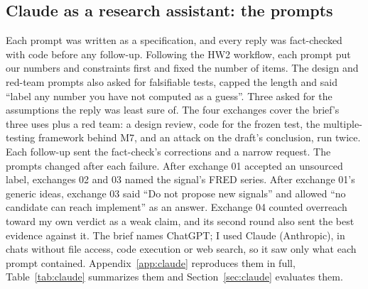 \subsection{Claude as a research assistant: the prompts}
\label{sec:prompts}

Each prompt was written as a specification, and every reply was fact-checked with code before any follow-up. Following the HW2 workflow, each prompt put our numbers and constraints first and fixed the number of items. The design and red-team prompts also asked for falsifiable tests, capped the length and said ``label any number you have not computed as a guess''. Three asked for the assumptions the reply was least sure of. The four exchanges cover the brief's three uses plus a red team: a design review, code for the frozen test, the multiple-testing framework behind M7, and an attack on the draft's conclusion, run twice. Each follow-up sent the fact-check's corrections and a narrow request. The prompts changed after each failure. After exchange 01 accepted an unsourced label, exchanges 02 and 03 named the signal's FRED series. After exchange 01's generic ideas, exchange 03 said ``Do not propose new signals'' and allowed ``no candidate can reach implement'' as an answer. Exchange 04 counted overreach toward my own verdict as a weak claim, and its second round also sent the best evidence against it. The brief names ChatGPT; I used Claude (Anthropic), in chats without file access, code execution or web search, so it saw only what each prompt contained. Appendix~\ref{app:claude} reproduces them in full, Table~\ref{tab:claude} summarizes them and Section~\ref{sec:claude} evaluates them.


